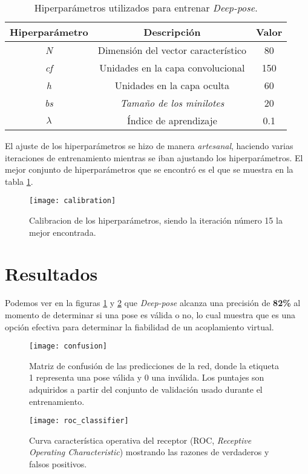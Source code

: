 \begin{table}[H]
\begin{center}
\begin{tabular}{|c|c|c|}
\hline
Hiperparámetro & Descripción                         & Valor \\ \hline
\textit{N}     & Dimensión del vector característico & 80    \\
\textit{cf}    & Unidades en la capa convolucional   & 150   \\
\textit{h}     & Unidades en la capa oculta          & 60    \\
\textit{bs}    & \textit{Tamaño de los minilotes}    & 20    \\
$\lambda$         & Índice de aprendizaje               & 0.1   \\ \hline
\end{tabular}
\caption{Hiperparámetros utilizados para entrenar \textit{Deep-pose}.}
\label{tab:hyp}
\end{center}
\end{table}

El ajuste de los hiperparámetros se hizo de manera \textit{artesanal},
haciendo varias iteraciones de entrenamiento mientras se iban ajustando
los hiperparámetros. El mejor conjunto de hiperparámetros que se encontró
es el que se muestra en la tabla \ref{tab:hyp}.

\begin{figure}[H]
  \texttt{[image: calibration]} \centering \caption{Calibracion
  de los hiperparámetros, siendo la iteración número 15 la mejor
  encontrada.}
\end{figure}

\section{Resultados}
Podemos ver en la figuras \ref{fig:confusion} y \ref{fig:roc}
que \textit{Deep-pose} alcanza una precisión de \textbf{82\%} al
momento de determinar si una pose es válida o no, lo cual muestra que
es una opción efectiva para determinar la fiabilidad de un
acoplamiento virtual.

\begin{figure}[h]
  \texttt{[image: confusion]} \centering
  \caption{Matriz de confusión de las predicciones de la red,
  donde la etiqueta 1 representa una pose válida y 0 una inválida.
  Los puntajes son adquiridos a partir del conjunto de validación
  usado durante el entrenamiento.}
  \label{fig:confusion}
\end{figure}

\begin{figure}[h]
  \texttt{[image: roc\_classifier]} \centering
  \caption{Curva característica operativa del receptor (ROC,
  \textit{Receptive Operating Characteristic}) mostrando
  las razones de verdaderos y falsos positivos.}
  \label{fig:roc}
\end{figure}
